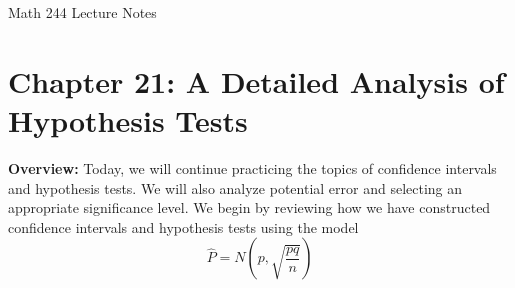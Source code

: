 \documentclass[12pt]{amsart}
\date{}
\theoremstyle{definition}
\begin{document}
\newcommand{\ph}{\phantom}
\newcommand{\ds}{\displaystyle}

\renewcommand{\emph}{\textbf}
\onehalfspace


\fancyhf{}   %
\renewcommand{\headrulewidth}{0.4pt} %
\fancyfootoffset[LE,LO]{0in}        %
\renewcommand{\footrulewidth}{0.4pt} %




\begin{center}

	\larger[3]	Math 244 Lecture Notes \smaller[3]		\\[22pt]

\end{center}

\section*{Chapter 21: A Detailed Analysis of Hypothesis Tests}




 \textbf{Overview:} Today, we will continue practicing the topics of confidence intervals and hypothesis tests. We will also analyze potential error and selecting an appropriate significance level.
 We begin by reviewing how we have constructed confidence intervals and hypothesis tests using the model $$\hat{P}=N\left(p,\sqrt{\frac{pq}{n}}\right)$$ 
 ~\\
 
\end{document}
